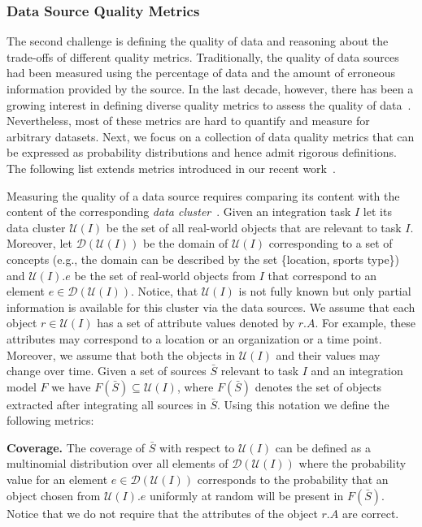 \documentclass{sig-alternate}
\begin{document}
\subsubsection{Data Source Quality Metrics} 
\label{sec:quality}
The second challenge is defining the quality of data and reasoning about the trade-offs of different quality metrics. Traditionally, the quality of data sources had been measured using the percentage of data and the amount of erroneous information provided by the source. In the last decade, however, there has been a growing interest in defining diverse quality metrics to assess the quality of data~\cite{pipino:2002}. Nevertheless, most of these metrics are hard to quantify and measure for arbitrary datasets. Next, we focus on a collection of data quality metrics that can be expressed as probability distributions and hence admit rigorous definitions. The following list extends metrics introduced in our recent work~\cite{dong:vldb13,rekatsinas:2014}.

Measuring the quality of a data source requires comparing its content with the content of the corresponding {\em data cluster}~\cite{rekatsinas:2014}. Given an integration task $I$ let its data cluster $\mathcal{U}(I)$  be the set of all real-world objects that are relevant to task $I$. Moreover, let $\mathcal{D}(\mathcal{U}(I))$ be the domain of $\mathcal{U}(I)$ corresponding to a set of concepts (e.g., the domain can be described by the set \{location, sports type\}) and $\mathcal{U}(I).e$ be the set of real-world objects from $I$ that correspond to an element $e \in \mathcal{D}(\mathcal{U}(I))$. Notice, that $\mathcal{U}(I)$ is not fully known but only partial information is available for this cluster via the data sources. We assume that each object $r \in \mathcal{U}(I)$ has a set of attribute values denoted by $r.A$. For example, these attributes may correspond to a location or an organization or a time point. Moreover, we assume that both the objects in $\mathcal{U}(I)$ and their values may change over time. Given a set of sources $\bar{S}$ relevant to task $I$ and an integration model $F$ we have $F(\bar{S}) \subseteq \mathcal{U}(I)$, where $F(\bar{S})$ denotes the set of objects extracted after integrating all sources in $\bar{S}$. Using this notation we define the following metrics:

\vspace{3pt}\noindent\textbf{Coverage.} The coverage of $\bar{S}$ with respect to $\mathcal{U}(I)$ can be defined as a multinomial distribution over all elements of $\mathcal{D}(\mathcal{U}(I))$ where the probability value for an element $e \in \mathcal{D}(\mathcal{U}(I))$ corresponds to the probability that an object chosen from $\mathcal{U}(I).e$ uniformly at random will be present in $F(\bar{S})$. Notice that we do not require that the attributes of the object $r.A$ are correct.
\end{document}
